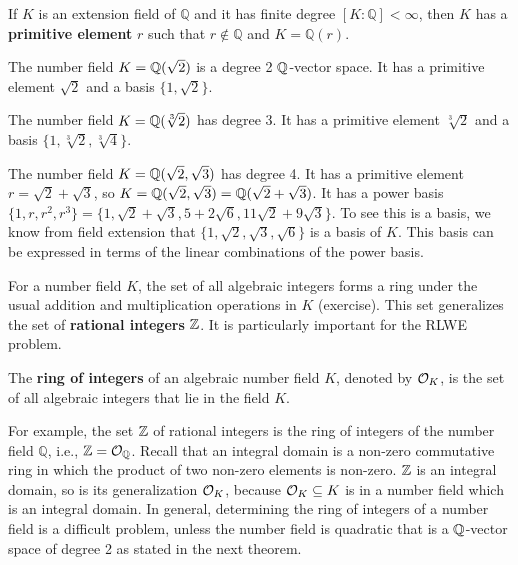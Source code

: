 \documentclass[../main.tex]{subfiles}
\begin{document}
\begin{theorem}
\label{app thm:primEleThm}
\reversemarginpar
{}
If $K$ is an extension field of $\mathbb{Q}$ and it has finite degree $[K:\mathbb{Q}] < \infty$, then $K$ has a
\textbf{primitive element} $r$ such that $r \notin \mathbb{Q}$ and $K=\mathbb{Q}(r)$.
\end{theorem}

\begin{example}
The number field $K=\mathbb{Q}(\sqrt{2})$ is a degree 2 $\mathbb{Q}$-vector space. It has a primitive element $\sqrt{2}$ and a basis $\{1, \sqrt{2}\}$.

The number field $K=\mathbb{Q}(\sqrt[3]{2})$ has degree 3. It has a primitive element $\sqrt[3]{2}$ and a basis $\{1,\sqrt[3]{2},\sqrt[3]{4}\}$. 

The number field $K=\mathbb{Q}(\sqrt{2},\sqrt{3})$ has degree 4. It has a primitive element $r=\sqrt{2}+\sqrt{3}$, so $K=\mathbb{Q}(\sqrt{2},\sqrt{3}) = \mathbb{Q}(\sqrt{2}+\sqrt{3})$. It has a power basis $\{1,r,r^2,r^3\}=\{1,\sqrt{2}+\sqrt{3},5+2\sqrt{6},11\sqrt{2}+9\sqrt{3}\}$. To see this is a basis, we know from field extension that $\{1,\sqrt{2},\sqrt{3},\sqrt{6}\}$ is a basis of $K$. This basis can be expressed in terms of the linear combinations of the power basis.
\end{example}

For a number field $K$, the set of all algebraic integers forms a ring under the usual addition and multiplication operations in $K$ (exercise).
This set generalizes the set of \textbf{rational integers} $\mathbb{Z}$. It is particularly important for the RLWE problem. 


\begin{definition}
\reversemarginpar
{}
The \textbf{ring of integers} of an algebraic number field $K$, denoted by $\mathcal{O}_K$, is the set of all algebraic integers that lie in the field $K$. 
\end{definition}
For example, the set $\mathbb{Z}$ of rational integers is the ring of integers of the number field $\mathbb{Q}$, i.e., $\mathbb{Z} = \mathcal{O}_{\mathbb{Q}}$. 
Recall that an integral domain is a non-zero commutative ring in which the product of two non-zero elements is non-zero. $\mathbb{Z}$ is an integral domain, 
\reversemarginpar
{}
so is its generalization $\mathcal{O}_K$, because $\mathcal{O}_K \subseteq K$ is in a number field which is an integral domain.
In general, determining the ring of integers of a number field is a difficult problem, unless the number field is quadratic that is a $\mathbb{Q}$-vector space of degree 2 as stated in the next theorem. 
\end{document}
